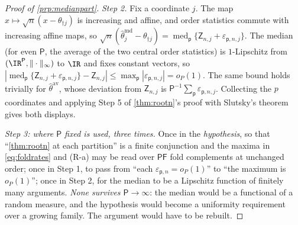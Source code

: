 \begin{proof}[Proof of \cref{prp:medianpart}]
\emph{Step 2.} Fix a coordinate $j$. The map $x\mapsto\sqrt n(x-\theta_{\dagger j})$ is increasing and
affine, and order statistics commute with increasing affine maps, so
$\sqrt n(\hat\theta^{\mathrm{md}}_j-\theta_{\dagger j})
=\operatorname{med}_{\mathsf p}\{\mathsf Z_{n,j}+\varepsilon_{\mathsf p,n,j}\}$.
The median (for even $\mathsf P$, the average of the two central order statistics) is $1$-Lipschitz from
$(\IR^{\mathsf P},\|\cdot\|_\infty)$ to $\IR$ and fixes constant vectors, so
$|\operatorname{med}_{\mathsf p}\{\mathsf Z_{n,j}+\varepsilon_{\mathsf p,n,j}\}-\mathsf Z_{n,j}|
\le\max_{\mathsf p}|\varepsilon_{\mathsf p,n,j}|=o_P(1)$. The
same bound holds trivially for $\hat\theta^{\mathrm{av}}$, whose deviation from $\mathsf Z_{n,j}$ is
$\mathsf P^{-1}\sum_{\mathsf p}\varepsilon_{\mathsf p,n,j}$. Collecting the $p$ coordinates and applying
Step 5 of \cref{thm:rootn}'s proof with Slutsky's theorem gives both displays.

\emph{Step 3: where $\mathsf P$ fixed is used, three times.} Once in the \emph{hypothesis}, so that
``\cref{thm:rootn} at each partition'' is a finite conjunction and the maxima in \eqref{eq:foldrates} and
(R-a) may be read over $\mathsf P\mathsf F$ fold complements at unchanged order; once in Step 1, to pass from
``each $\varepsilon_{\mathsf p,n}=o_P(1)$'' to ``the maximum is $o_P(1)$''; once in Step 2, for the median
to be a Lipschitz function of finitely many arguments. \emph{None survives $\mathsf P\to\infty$}: the median would be
a functional of a random measure, and the hypothesis would become a uniformity requirement over a growing
family. The argument would have to be rebuilt.
\end{proof}

